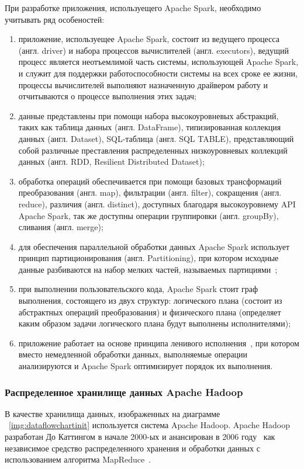 При разработке приложения, используещего Apache Spark, необходимо учитывать ряд особеностей:
\begin{enumerate}
    \item приложение, используещее Apache Spark, состоит из ведущего процесса (англ. driver) и набора процессов 
    вычислителей (англ. executors), ведущий процесс является неотъемлимой часть системы, использующей Apache Spark,
    и служит для поддержки работоспособности системы на всех сроке ее жизни, процессы вычислителей выполняют
    назначенную драйвером работу и отчитываются о процессе выполнения этих задач;
    \item данные представлены при помощи набора высокоуровневых абстракций, таких как таблица данных (англ. DataFrame),
    типизированная коллекция данных (англ. Dataset), SQL-таблица (англ. SQL TABLE),  представляющий собой различные
    преставления распределенных низкоуровневых коллекций данных (англ. RDD, Resilient Distributed Dataset);
    \item обработка операций обеспечивается при помощи базовых трансформаций преобразования (англ. map), фильтрации (англ. filter), 
    сокращения (англ. reduce), различия (англ. distinct), доступных благодаря высокоуровнему API Apache Spark, так же доступны
    операции группировки (англ. groupBy), сливания (англ. merge);
    \item для обеспечения параллельной обработки данных Apache Spark использует принцип партиционирования (англ. Partitioning),
    при котором исходные данные разбиваются на набор мелких частей, называемых партициями~\autocite{impl:partioning};
    \item при выполнении пользовательского кода, Apache Spark стоит граф выполнения, состоящего из двух структур: логического 
    плана (состоит из абстрактных операций преобразования) и физического плана (определяет каким образом задачи логического 
    плана будут выполнены исполнителями);
    \item приложение работает на основе принципа ленивого исполнения~\autocite{impl:spark-guide}, при котором вместо немедленной обработки данных,
    выполняемые операции анализируются и Apache Spark оптимизирует порядок их выполнения. 
\end{enumerate}

\subsubsection{Распределенное хранилище данных Apache Hadoop}
В качестве хранилища данных, изображенных на диаграмме ~\ref{img:dataflowchartinit} используется система
Apache Hadoop. Apache Hadoop разработан До Каттингом в начале 2000-ых и анансирован в 2006 году~\autocite{impl:hadoop}
как независимое средство распределенного хранения и обработки данных с использованием алгоритма MapReduce~\autocite{impl:mapreduce}.

